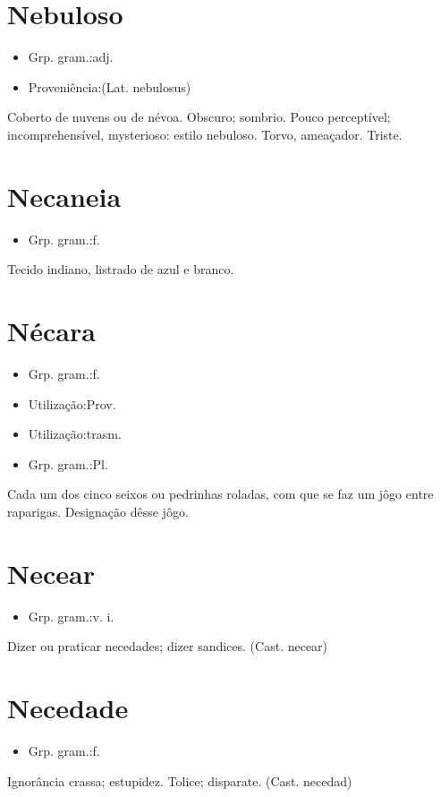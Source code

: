 \section{Nebuloso}
\begin{itemize}
\item {Grp. gram.:adj.}
\end{itemize}
\begin{itemize}
\item {Proveniência:(Lat. \textunderscore nebulosus\textunderscore )}
\end{itemize}
Coberto de nuvens ou de névoa.
Obscuro; sombrio.
Pouco perceptível; incomprehensível, mysterioso: \textunderscore estilo nebuloso\textunderscore .
Torvo, ameaçador.
Triste.
\section{Necaneia}
\begin{itemize}
\item {Grp. gram.:f.}
\end{itemize}
Tecido indiano, listrado de azul e branco.
\section{Nécara}
\begin{itemize}
\item {Grp. gram.:f.}
\end{itemize}
\begin{itemize}
\item {Utilização:Prov.}
\end{itemize}
\begin{itemize}
\item {Utilização:trasm.}
\end{itemize}
\begin{itemize}
\item {Grp. gram.:Pl.}
\end{itemize}
Cada um dos cinco seixos ou pedrinhas roladas, com que se faz um jôgo entre raparigas.
Designação dêsse jôgo.
\section{Necear}
\begin{itemize}
\item {Grp. gram.:v. i.}
\end{itemize}
Dizer ou praticar necedades; dizer sandices.
(Cast. \textunderscore necear\textunderscore )
\section{Necedade}
\begin{itemize}
\item {Grp. gram.:f.}
\end{itemize}
Ignorância crassa; estupidez.
Tolice; disparate.
(Cast. \textunderscore necedad\textunderscore )
